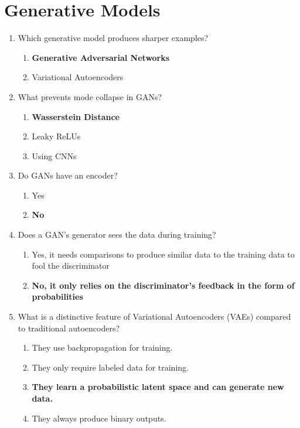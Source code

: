 \documentclass{report}
\numberwithin{equation}{section}
\begin{document}
\section{Generative Models}

\begin{enumerate}
    \item Which generative model produces sharper examples?
    \begin{enumerate}[label=\alph*.]
        \item \textbf{Generative Adversarial Networks}
        \item Variational Autoencoders
    \end{enumerate}
    \item What prevents mode collapse in GANs?
    \begin{enumerate}[label=\alph*.]
        \item \textbf{Wasserstein Distance}
        \item Leaky ReLUs
        \item Using CNNs
    \end{enumerate}
    \item Do GANs have an encoder?
    \begin{enumerate}[label=\alph*.]
        \item Yes
        \item \textbf{No}
    \end{enumerate}
    \item Does a GAN's generator sees the data during training?
    \begin{enumerate}[label=\alph*.]
        \item Yes, it needs comparisons to produce similar data to the training data to fool the discriminator
        \item \textbf{No, it only relies on the discriminator's feedback in the form of probabilities}
    \end{enumerate}

\item What is a distinctive feature of Variational Autoencoders (VAEs) compared to traditional autoencoders?
\begin{enumerate}[label=\alph*.]
    \item They use backpropagation for training.
    \item They only require labeled data for training.
    \item \textbf{They learn a probabilistic latent space and can generate new data.}
    \item They always produce binary outputs.
\end{enumerate}


\end{enumerate}
\end{document}
